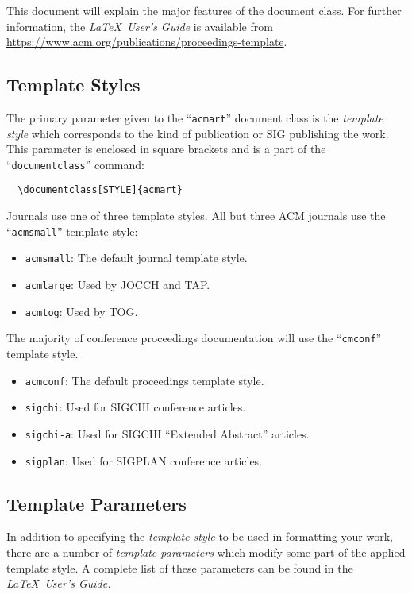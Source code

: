 \documentclass[manuscript,screen,review]{acmart}
\providecommand{\tightlist}{%
  \setlength{\itemsep}{0pt}\setlength{\parskip}{0pt}}\usepackage{longtable,booktabs,array}
\begin{document}
This document will explain the major features of the document class. For
further information, the \emph{\LaTeX~User's Guide} is available from
\url{https://www.acm.org/publications/proceedings-template}.

\subsection{Template Styles}\label{template-styles}

The primary parameter given to the ``\texttt{acmart}'' document class is
the \emph{template style} which corresponds to the kind of publication
or SIG publishing the work. This parameter is enclosed in square
brackets and is a part of the ``\texttt{documentclass}'' command:

\begin{verbatim}
  \documentclass[STYLE]{acmart}
\end{verbatim}

Journals use one of three template styles. All but three ACM journals
use the ``\texttt{acmsmall}'' template style:

\begin{itemize}
\tightlist
\item
  \texttt{acmsmall}: The default journal template style.
\item
  \texttt{acmlarge}: Used by JOCCH and TAP.
\item
  \texttt{acmtog}: Used by TOG.
\end{itemize}

The majority of conference proceedings documentation will use the
``\texttt{cmconf}'' template style.

\begin{itemize}
\tightlist
\item
  \texttt{acmconf}: The default proceedings template style.
\item
  \texttt{sigchi}: Used for SIGCHI conference articles.
\item
  \texttt{sigchi-a}: Used for SIGCHI ``Extended Abstract'' articles.
\item
  \texttt{sigplan}: Used for SIGPLAN conference articles.
\end{itemize}

\subsection{Template Parameters}\label{template-parameters}

In addition to specifying the \emph{template style} to be used in
formatting your work, there are a number of \emph{template parameters}
which modify some part of the applied template style. A complete list of
these parameters can be found in the \emph{\LaTeX~User's Guide.}
\end{document}
